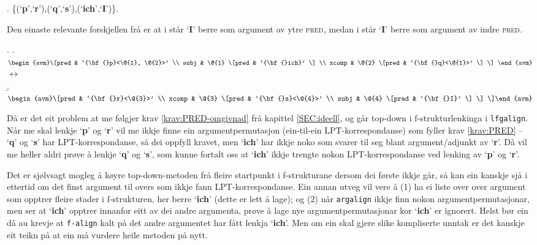 \documentclass[12pt,a4paper,oneside,draft]{report}
\newcommand{\F}[2]{\textsc{#1}\ensuremath{_{#2}}}
\newcommand{\PRED}{\F{pred}{}}
\newcommand{\p}[1]{`\textbf{#1}'}
\begin{document}
\ex. \{(\p{p},\p{r}),(\p{q},\p{s}),(\p{ich},\p{I})\}.

Den einaste relevante forskjellen frå \LLast er at i \LLast står \p{I}
 berre som argument av ytre \PRED{}, medan i \Next står \p{I} berre
 som argument av indre \PRED{}.

{\avmoptions{}
\ex. \a. $\begin{avm}\[pred & `{\bf{}p}<\@{1}, \@{2}>'  \\
     subj & \@{1} \[pred &  `{\bf{}ich}' \] \\
     xcomp & \@{2} \[pred & `{\bf{}q}<\@{1}>' \] \] \end{avm}$
     $\\\\\leftrightarrow$\\
     \b. $\begin{avm}\[pred & `{\bf{}r}<\@{3}>' \\
     xcomp & \@{3} \[pred & `{\bf{}s}<\@{4}>' \\
     subj & \@{4} \[pred &  `{\bf{}I}' \] \] \]\end{avm}$

}

Då er det eit problem at me følgjer krav \ref{krav:PRED-omgivnad} frå
 kapittel \ref{SEC:ideell}, og går top-down i f\hyp{}strukturlenkinga i
 \texttt{lfgalign}. Når me skal lenkje \p{p} og \p{r} vil me ikkje finne ein
 argumentpermutasjon (ein-til-ein LPT\hyp{}korrespondanse) som fyller krav
 \ref{krav:PRED} -- \p{q} og \p{s} har LPT\hyp{}korrespondanse, så dei
 oppfyll kravet, men \p{ich} har ikkje noko som svarer til seg blant
 argument/adjunkt av \p{r}. Då vil me heller aldri prøve å lenkje
 \p{q} og \p{s}, som kunne fortalt oss at \p{ich} ikkje trengte nokon
 LPT\hyp{}korrespondanse ved lenking av \p{p} og \p{r}.

Det er sjølvsagt mogleg å køyre top-down-metoden frå fleire startpunkt
 i f\hyp{}strukturane dersom dei første ikkje går, så kan ein kanskje sjå i
 ettertid om det finst argument til overs som ikkje fann
 LPT\hyp{}korrespondanse. Ein annan utveg vil vere å (1) ha ei liste over
 over argument som opptrer fleire stader i f\hyp{}strukturen, her berre
 \p{ich} (dette er lett å lage); og (2) når \texttt{argalign} ikkje finn
 nokon argumentpermutasjonar, men ser at \p{ich} opptrer innanfor eitt
 av dei andre argumenta, prøve å lage nye argumentpermutasjonar kor
 \p{ich} er ignorert. Helst bør ein då au krevje at \texttt{f-align} kalt på
 det andre argumentet har fått lenkja \p{ich}.  Men om ein skal gjere
 slike kompliserte unntak er det kanskje eit teikn på at ein må
 vurdere heile metoden på nytt.
\end{document}
